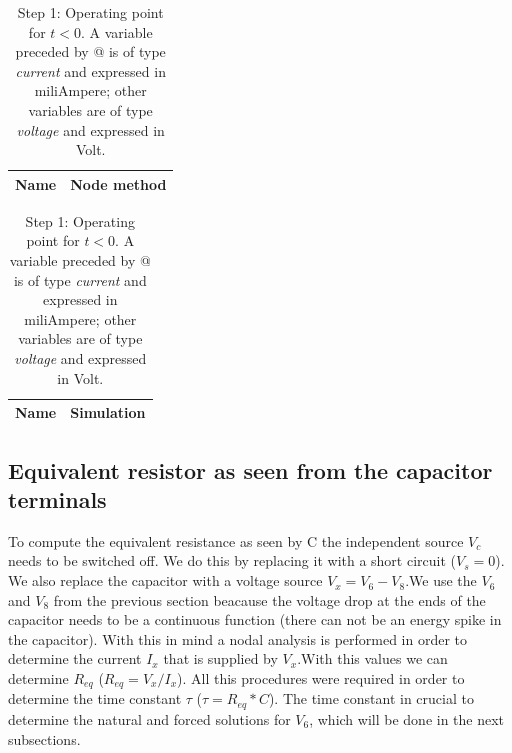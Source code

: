\begin{table}[H]
\parbox{.45\linewidth}{
  \centering 
  \begin{tabular}{|l|r|}
    \hline    
    {\bf Name} & {\bf Node method}\\ \hline
    
  \end{tabular}
  \caption{A variable that starts with "Ir" and the variable "Gb" are of type {\em current}
    and expressed in milliampere (mA); all the other variables that start with a "V" are of the type {\it voltage} and expressed in
    Volt (V).}
  \label{tab:theoretical}
  
 }
 \hfill
 \parbox{.45\linewidth}{
 \centering
  \begin{tabular}{|l|r|}
    \hline    
    {\bf Name} & {\bf Simulation} \\ \hline
    
  \end{tabular}
  \caption{Step 1: Operating point for $t<0$. A variable preceded by @ is of type {\em current}
    and expressed in miliAmpere; other variables are of type {\it voltage} and expressed in
    Volt.}
  \label{tab:op}
 
 }
\end{table}


\subsection{Equivalent resistor as seen from the capacitor terminals}

To compute the equivalent resistance as seen by C the independent source $V_c$ needs to be switched off. We do this by replacing it with a short circuit ($V_s=0$). We also replace the capacitor with a voltage source $V_x=V_6-V_8$.We use the $V_6$ and $V_8$ from the previous section beacause the voltage drop at the ends of the capacitor needs to be a continuous function (there can not be an energy spike in the capacitor). With this in mind a nodal analysis is performed in order to determine the current $I_x$ that is supplied by $V_x$.With this values we can determine $R_{eq}$ ($R_{eq}=V_x/I_x$). All this procedures were required in order to determine the time constant $\tau$ ($\tau=R_{eq}*C$). The time constant in crucial to determine the natural and forced solutions for $V_6$, which will be done in the next subsections. 

